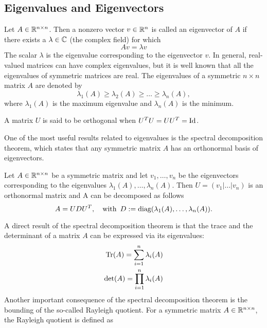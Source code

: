 \documentclass[10pt,a4paper]{article}
\begin{document}
\subsection{Eigenvalues and Eigenvectors}
Let $A \in \mathbb{R}^{n\times n}$. Then a nonzero vector $v \in \mathbb{R}^n$ is called an eigenvector of $A$ if there exists a $\lambda \in \mathbb{C}$ (the complex field) for which
\begin{equation*}
	A v = \lambda v
\end{equation*}
The scalar $\lambda$ is the eigenvalue corresponding to the eigenvector $v$. In general, real-valued matrices can have complex eigenvalues, but it is well known that all the eigenvalues of symmetric matrices are real. The eigenvalues of a symmetric $n \times n$ matrix $A$ are denoted by
\begin{equation*}
	\lambda_1(A)\geq \lambda_2(A) \geq \dots \geq \lambda_n(A),
\end{equation*}
where $\lambda_1(A)$ is the maximum eigenvalue and $\lambda_n(A)$ is the minimum.
\begin{definition}
	A matrix $U$ is said to be orthogonal when $U^TU =UU^T=\text{Id}$.
\end{definition}
One of the most useful results related to eigenvalues is the spectral decomposition theorem, which states that any symmetric matrix $A$ has an orthonormal basis of eigenvectors.
\begin{theorem}
	Let $A\in \mathbb{R}^{n\times n}$ be a symmetric matrix and let $v_1,\dots, v_n$ be the eigenvectors corresponding to the eigenvalues $\lambda_1(A), \dots, \lambda_n(A)$. Then $U= \left(v_1 | \dots | v_n\right)$ is an orthonormal matrix and A can be decomposed as follows 
	\begin{equation*}
		A = UDU^T, \quad \text{with }\, D:=\text{diag}(\lambda_1(A), \dots, \lambda_n(A)).
	\end{equation*}
\end{theorem}
A direct result of the spectral decomposition theorem is that the trace and the determinant of a matrix $A$ can be expressed via its eigenvalues:
\begin{equation*}
	\begin{split}
		\text{Tr}(A) = \sum_{i=1}^n \lambda_i(A)\\
		\det(A) = \prod_{i=1}^n \lambda_i(A)
	\end{split}
\end{equation*}
Another important consequence of the spectral decomposition theorem is the bounding of the so-called Rayleigh quotient. For a symmetric matrix $A \in \mathbb{R}^{n\times n}$, the Rayleigh quotient is defined as
\end{document}
